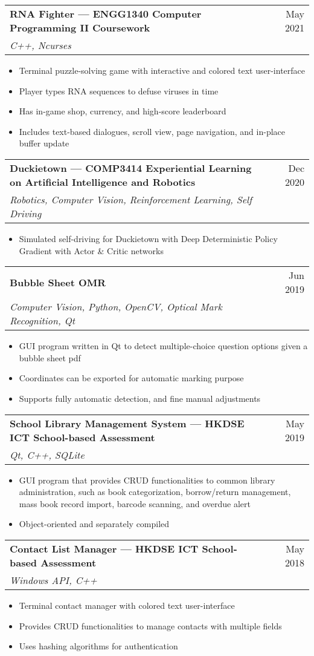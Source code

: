 \documentclass{article}
\newcommand{\jobTitle}[3]{
\vspace{0.4cm}
\begin{tabularx}{0.99\linewidth}{ X r }
    \textbf{#1} & #2\\
    \textit{#3} &
\end{tabularx}
\vspace{0.2cm}
}
\newenvironment{descitemize}
{ \begin{itemize}[leftmargin=1.4cm,,topsep=0pt]
    \setlength{\parskip}{0pt}
    \setlength{\parsep}{0pt}     }
{ \end{itemize}                  }
\begin{document}
\jobTitle
{RNA Fighter --- ENGG1340 Computer Programming II Coursework}
{May 2021}
{C++, Ncurses}
\begin{descitemize}
    \item Terminal puzzle-solving game with interactive and colored text user-interface
    \item Player types RNA sequences to defuse viruses in time
	\item Has in-game shop, currency, and high-score leaderboard
	\item Includes text-based dialogues, scroll view, page navigation, and in-place buffer update
\end{descitemize}

\jobTitle
{Duckietown --- COMP3414 Experiential Learning on Artificial Intelligence and Robotics}
{Dec 2020}
{Robotics, Computer Vision, Reinforcement Learning, Self Driving}
\begin{descitemize}
    \item Simulated self-driving for Duckietown with Deep Deterministic Policy Gradient with Actor \& Critic networks
\end{descitemize}

\jobTitle
{Bubble Sheet OMR}
{Jun 2019}
{Computer Vision, Python, OpenCV, Optical Mark Recognition, Qt}
\begin{descitemize}
    \item GUI program written in Qt to detect multiple-choice question options given a bubble sheet pdf
    \item Coordinates can be exported for automatic marking purpose
    \item Supports fully automatic detection, and fine manual adjustments
\end{descitemize}

\jobTitle
{School Library Management System --- HKDSE ICT School-based Assessment}
{May 2019}
{Qt, C++, SQLite}
\begin{descitemize}
    \item GUI program that provides CRUD functionalities to common library administration, such as book categorization, borrow/return management, mass book record import, barcode scanning, and overdue alert
    \item Object-oriented and separately compiled
\end{descitemize}

\jobTitle
{Contact List Manager --- HKDSE ICT School-based Assessment}
{May 2018}
{Windows API, C++}
\begin{descitemize}
    \item Terminal contact manager with colored text user-interface
    \item Provides CRUD functionalities to manage contacts with multiple fields
    \item Uses hashing algorithms for authentication
\end{descitemize}
\end{document}
